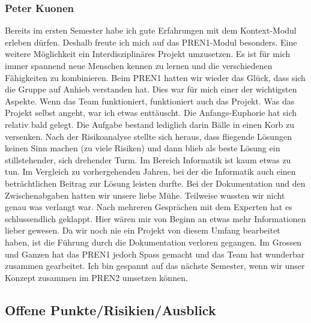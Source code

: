 \subsubsection*{Peter Kuonen}
Bereits im ersten Semester habe ich gute Erfahrungen mit dem Kontext-Modul erleben dürfen. Deshalb freute ich mich auf das PREN1-Modul besonders. Eine weitere Möglichkeit ein Interdisziplinäres Projekt umzusetzen. Es ist für mich immer spannend neue Menschen kennen zu lernen und die verschiedenen Fähigkeiten zu kombinieren. Beim PREN1 hatten wir wieder das Glück, dass sich die Gruppe auf Anhieb verstanden hat. Dies war für mich einer der wichtigsten Aspekte. Wenn das Team funktioniert, funktioniert auch das Projekt.
Was das Projekt selbst angeht, war ich etwas enttäuscht. Die Anfangs-Euphorie hat sich relativ bald gelegt. Die Aufgabe bestand lediglich darin Bälle in einen Korb zu versenken. Nach der Risikoanalyse stellte sich heraus, dass fliegende Lösungen keinen Sinn machen (zu viele Risiken) und dann blieb als beste Lösung ein stillstehender, sich drehender Turm. Im Bereich Informatik ist  kaum etwas zu tun. Im Vergleich zu vorhergehenden Jahren, bei der die Informatik auch einen beträchtlichen Beitrag zur Lösung leisten durfte.
Bei der Dokumentation und den Zwischenabgaben hatten wir unsere liebe Mühe. Teilweise wussten wir nicht genau was verlangt war. Nach mehreren Gesprächen mit dem Experten hat es  schlussendlich geklappt. Hier wären mir von Beginn an etwas mehr Informationen lieber gewesen. Da wir noch nie ein Projekt von diesem Umfang bearbeitet haben, ist die Führung durch die Dokumentation verloren gegangen. 
Im Grossen und Ganzen hat das PREN1 jedoch Spass gemacht und das Team hat wunderbar zusammen gearbeitet. Ich bin gespannt auf das nächste Semester, wenn wir unser Konzept zusammen im PREN2 umsetzen können.


\subsection{Offene Punkte/Risikien/Ausblick}
